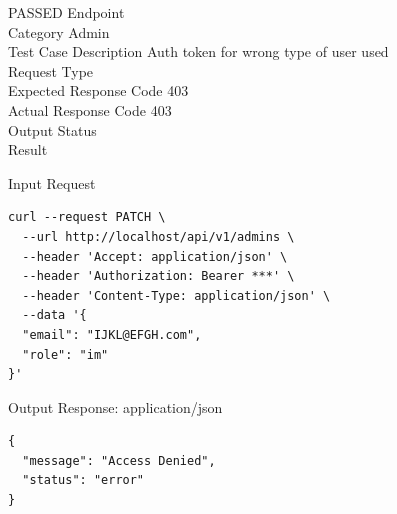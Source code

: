 \begin{testcase}{35}{PASSED}
Endpoint \hfill {}\\
Category \hfill Admin\\
Test Case Description \hfill Auth token for wrong type of user used\\

Request Type    \hfill {}\\
Expected Response Code    \hfill 403\\
Actual Response Code    \hfill 403\\

Output Status \hfill {}\\
Result \hfill {}

\begin{ipblock}{Input Request}
\begin{verbatim}
curl --request PATCH \
  --url http://localhost/api/v1/admins \
  --header 'Accept: application/json' \
  --header 'Authorization: Bearer ***' \
  --header 'Content-Type: application/json' \
  --data '{
  "email": "IJKL@EFGH.com",
  "role": "im"
}'
\end{verbatim}
\end{ipblock}

\begin{opblock}{Output Response: application/json}
\begin{verbatim}
{
  "message": "Access Denied",
  "status": "error"
}
\end{verbatim}
\end{opblock}
\end{testcase}

